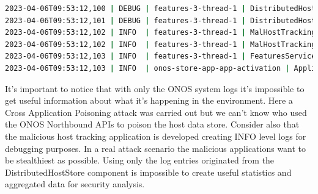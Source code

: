 \begin{lstlisting}[language=bash]
2023-04-06T09:53:12,100 | DEBUG | features-3-thread-1 | DistributedHostStore             | 192 - org.onosproject.onos-core-dist - 2.7.0 | Removing location of:0000000000000001/1 from host 00:00:00:00:00:01/None
2023-04-06T09:53:12,101 | DEBUG | features-3-thread-1 | DistributedHostStore             | 192 - org.onosproject.onos-core-dist - 2.7.0 | Removing location of:0000000000000003/1 from host 00:00:00:00:00:03/None
2023-04-06T09:53:12,102 | INFO  | features-3-thread-1 | MalHostTracking                  | 215 - org.onosproject.onos-malhosttracking - 2.0.0.SNAPSHOT | Malicious Host Tracking App: Locations successfully poisoned: [of:0000000000000003/1] and [of:0000000000000001/1]
2023-04-06T09:53:12,102 | INFO  | features-3-thread-1 | MalHostTracking                  | 215 - org.onosproject.onos-malhosttracking - 2.0.0.SNAPSHOT | Started malhosttracking App!
2023-04-06T09:53:12,103 | INFO  | features-3-thread-1 | FeaturesServiceImpl              | 11 - org.apache.karaf.features.core - 4.2.9 | Done.
2023-04-06T09:53:12,103 | INFO  | onos-store-app-app-activation | ApplicationManager               | 193 - org.onosproject.onos-core-net - 2.7.0 | Application org.onosproject.malhosttracking has been activated
\end{lstlisting}

It's important to notice that with only the ONOS system logs it's impossible to get useful information about what it's happening in the environment. Here a Cross Application Poisoning attack was carried out but we can't know who used the ONOS Northbound APIs to poison the host data store. Consider also that the malicious host tracking application is developed creating INFO level logs for debugging purposes. In a real attack scenario the malicious applications want to be stealthiest as possible. Using only the log entries originated from the DistributedHostStore component is impossible to create useful statistics and aggregated data for security analysis.
\medskip

